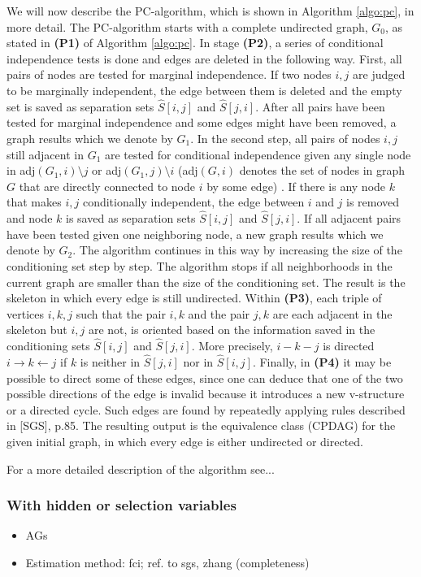 \documentclass[article]{jss}
\begin{document}
We will now describe the PC-algorithm, which is shown in Algorithm
\ref{algo:pc}, in more detail. The PC-algorithm starts with a complete
undirected graph, $G_0$, as stated in \textbf{(P1)} of Algorithm
\ref{algo:pc}. In stage \textbf{(P2)}, a series of conditional independence
tests is done and edges are deleted in the following way. First, all pairs
of nodes are tested for marginal independence. If two nodes $i,j$ are
judged to be marginally independent, the edge between them is deleted and
the empty set is saved as separation sets $\hat{S}[i,j]$ and
$\hat{S}[j,i]$. After all pairs have been tested for marginal independence
and some edges might have been removed, a graph results which we denote by
$G_1$. In the second step, all pairs of nodes $i,j$ still adjacent in $G_1$
are tested for conditional independence given any single node in
adj$(G_1,i)\setminus j$ or adj$(G_1,j)\setminus i$ (adj$(G,i)$ denotes the
set of nodes in graph $G$ that are directly connected to node $i$ by some
edge) . If there is any node $k$ that makes $i,j$ conditionally
independent, the edge between $i$ and $j$ is removed and node $k$ is saved
as separation sets $\hat{S}[i,j]$ and $\hat{S}[j,i]$. If all adjacent pairs
have been tested given one neighboring node, a new graph results which we
denote by $G_2$. The algorithm continues in this way by increasing the size
of the conditioning set step by step. The algorithm stops if all
neighborhoods in the current graph are smaller than the size of the
conditioning set. The result is the skeleton in which every edge is still
undirected. Within \textbf{(P3)}, each triple of vertices $i,k,j$ such that
the pair $i,k$ and the pair $j,k$ are each adjacent in the skeleton but
$i,j$ are not, is oriented based on the information saved in the
conditioning sets $\hat{S}[i,j]$ and $\hat{S}[j,i]$. More precisely,
$i-k-j$ is directed $i \rightarrow k \leftarrow j$ if $k$ is neither in
$\hat{S}[j,i]$ nor in $\hat{S}[i,j]$. Finally, in \textbf{(P4)} it
may be possible to direct some of these edges, since one can deduce that
one of the two possible directions of the edge is invalid because it
introduces a new v-structure or a directed cycle. Such edges are found by
repeatedly applying rules described in [SGS], p.85. The resulting output is the
equivalence class (CPDAG) for the given initial graph, in which every edge
is either undirected or directed.

For a more detailed description of the algorithm see...
\subsubsection{With hidden or selection variables}
\begin{itemize}
\item AGs
\item Estimation method: fci; ref. to sgs, zhang (completeness)
\end{itemize}
\end{document}
